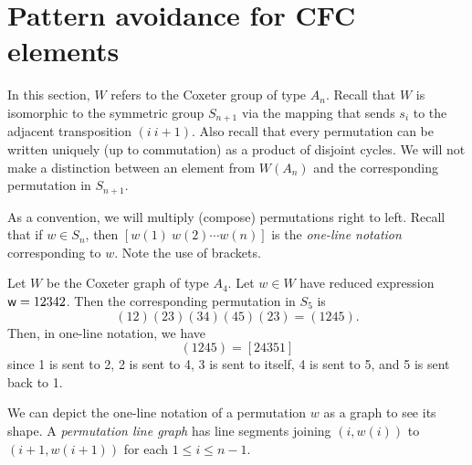 \section{Pattern avoidance for CFC elements}\label{sec:Sn}
    In this section, $W$ refers to the Coxeter group of type $A_n$. Recall that $W$ is isomorphic to the symmetric group $S_{n+1}$ via the mapping that sends $s_i$ to the adjacent transposition $(i~i+1)$.
    Also recall that every permutation can be written uniquely (up to commutation) as a product of disjoint cycles.
    We will not make a distinction between an element from $W(A_n)$ and the corresponding permutation in $S_{n+1}$.

    As a convention, we will multiply (compose) permutations right to left.
    Recall that if $w \in S_n$, then $[w(1)~w(2) \cdots w(n)]$ is the \emph{one-line notation} corresponding to $w$. Note the use of brackets.

\begin{example} Let $W$ be the Coxeter graph of type $A_4$. Let $w \in W$ have reduced expression $\mathsf{w} = 12342$.
    Then the corresponding permutation in $S_5$ is $$(12)(23)(34)(45)(23) = (1245).$$
    Then, in one-line notation, we have $$(1245) = [24351]$$ since 1 is sent to 2, 2 is sent to 4, 3 is sent to itself, 4 is sent to 5, and 5 is sent back to 1.
\end{example}

    We can depict the one-line notation of a permutation $w$ as a graph to see its shape. A \emph{permutation line graph} has line segments joining $(i,w(i))$ to $(i+1,w(i+1))$ for each $1 \leq i \leq n-1$.

